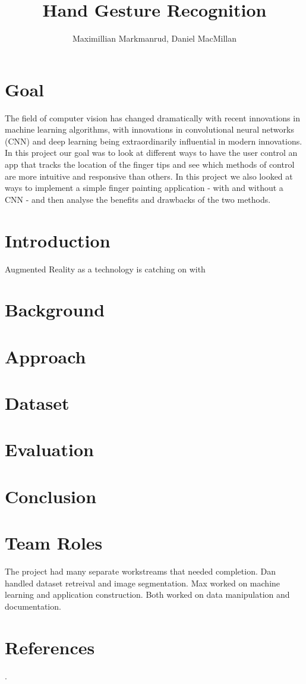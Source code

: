 \documentclass[twocolumn]{article}
\title{Hand Gesture Recognition}
\author{Maximillian Markmanrud, Daniel MacMillan}
\begin{document}
\maketitle

\section{Goal}
The field of computer vision has changed dramatically with recent innovations in machine learning algorithms, with innovations in convolutional neural networks (CNN) and deep learning being extraordinarily influential in modern innovations. In this project our goal was to look at different ways to have the user control an app that tracks the location of the finger tips and see which methods of control are more intuitive and responsive than others. In this project we also looked at ways to implement a simple finger painting application - with and without a CNN - and then analyse the benefits and drawbacks of the two methods.

\section{Introduction}
Augmented Reality as a technology is catching on with 


\section{Background}


\section{Approach}


\section{Dataset}


\section{Evaluation}


\section{Conclusion}


\section{Team Roles}

The project had many separate workstreams that needed completion.
Dan handled dataset retreival and image segmentation.
Max worked on machine learning and application construction.
Both worked on data manipulation and documentation.




\section{References}
.
\end{document}

